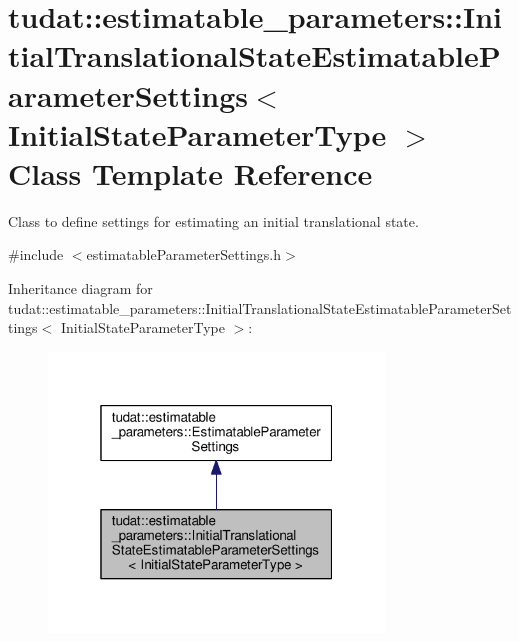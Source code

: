 \hypertarget{classtudat_1_1estimatable__parameters_1_1InitialTranslationalStateEstimatableParameterSettings}{}\section{tudat\+:\+:estimatable\+\_\+parameters\+:\+:Initial\+Translational\+State\+Estimatable\+Parameter\+Settings$<$ Initial\+State\+Parameter\+Type $>$ Class Template Reference}
\label{classtudat_1_1estimatable__parameters_1_1InitialTranslationalStateEstimatableParameterSettings}


Class to define settings for estimating an initial translational state.  




{\ttfamily \#include $<$estimatable\+Parameter\+Settings.\+h$>$}



Inheritance diagram for tudat\+:\+:estimatable\+\_\+parameters\+:\+:Initial\+Translational\+State\+Estimatable\+Parameter\+Settings$<$ Initial\+State\+Parameter\+Type $>$\+:
\nopagebreak
\begin{figure}[H]
\begin{center}
\leavevmode
\includegraphics[width=253pt]{classtudat_1_1estimatable__parameters_1_1InitialTranslationalStateEstimatableParameterSettings__inherit__graph}
\end{center}
\end{figure}


